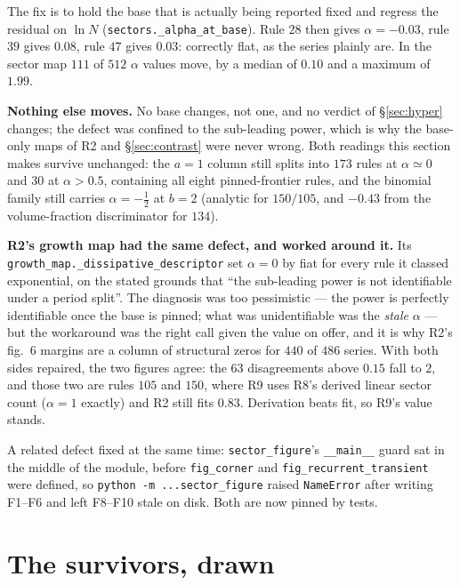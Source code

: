 \documentclass[11pt]{article}
\theoremstyle{plain}
\theoremstyle{definition}
\begin{document}
The fix is to hold the base that is actually being reported fixed and regress the
residual on $\ln N$ (\texttt{sectors.\_alpha\_at\_base}). Rule $28$ then gives
$\alpha = -0.03$, rule $39$ gives $0.08$, rule $47$ gives $0.03$: correctly flat,
as the series plainly are. In the sector map $111$ of $512$ $\alpha$ values move,
by a median of $0.10$ and a maximum of $1.99$.

\noindent\textbf{Nothing else moves.} No base changes, not one, and no verdict of
\S\ref{sec:hyper} changes; the defect was confined to the sub-leading power,
which is why the base-only maps of R2 and \S\ref{sec:contrast} were never wrong. Both
readings this section makes survive unchanged: the $a=1$ column still splits into
$173$ rules at $\alpha\simeq0$ and $30$ at $\alpha>0.5$, containing all eight
pinned-frontier rules, and the binomial family still carries $\alpha=-\tfrac12$ at
$b=2$ (analytic for $150/105$, and $-0.43$ from the volume-fraction discriminator
for $134$).

\noindent\textbf{R2's growth map had the same defect, and worked around it.}
Its \texttt{growth\_map.\_dissipative\_descriptor} set $\alpha=0$ by fiat for
every rule it classed exponential, on the stated grounds that ``the sub-leading
power is not identifiable under a period split''. The diagnosis was too
pessimistic --- the power is perfectly identifiable once the base is pinned; what
was unidentifiable was the \emph{stale} $\alpha$ --- but the workaround was the
right call given the value on offer, and it is why R2's fig.\ 6 margins are a
column of structural zeros for $440$ of $486$ series. With both sides repaired,
the two figures agree: the $63$ disagreements above $0.15$ fall to $2$, and those
two are rules $105$ and $150$, where R9 uses R8's derived linear sector count
($\alpha=1$ exactly) and R2 still fits $0.83$. Derivation beats fit, so R9's
value stands.

\noindent A related defect fixed at the same time: \texttt{sector\_figure}'s
\verb|__main__| guard sat in the middle of the module, before \texttt{fig\_corner}
and \texttt{fig\_recurrent\_transient} were defined, so
\verb|python -m ...sector_figure| raised \texttt{NameError} after writing F1--F6
and left F8--F10 stale on disk. Both are now pinned by tests.

\section{The survivors, drawn}
\label{sec:graphs}
\end{document}
